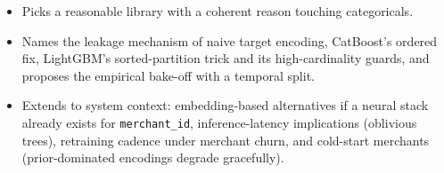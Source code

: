 \begin{interviewq}
\goodgreat
\begin{itemize}
    \item {} Picks a reasonable library with a coherent reason touching categoricals.
    \item {} Names the leakage mechanism of naive target encoding, CatBoost's ordered fix, LightGBM's sorted-partition trick and its high-cardinality guards, and proposes the empirical bake-off with a temporal split.
    \item {} Extends to system context: embedding-based alternatives if a neural stack already exists for \texttt{merchant\_id}, inference-latency implications (oblivious trees), retraining cadence under merchant churn, and cold-start merchants (prior-dominated encodings degrade gracefully).
\end{itemize}

\end{interviewq}

